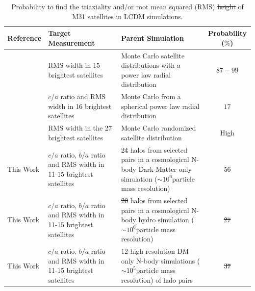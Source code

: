 \documentclass[a4paper,fleqn,usenatbib]{mnras}
\newcommand{\Msun}{{\ifmmode{{\rm{M_{\odot}}}}\else{${\rm{M_{\odot}}}$}\fi}}
\providecommand{\DIFaddtex}[1]{{\protect\color{blue}\uwave{#1}}} %
\providecommand{\DIFdeltex}[1]{{\protect\color{red}\sout{#1}}}                      %
\providecommand{\DIFaddFL}[1]{\DIFadd{#1}} %
\providecommand{\DIFdelFL}[1]{\DIFdel{#1}} %
\providecommand{\DIFaddbeginFL}{} %
\providecommand{\DIFaddendFL}{} %
\providecommand{\DIFdelbeginFL}{} %
\providecommand{\DIFdelendFL}{} %
\providecommand{\DIFadd}[1]{\texorpdfstring{\DIFaddtex{#1}}{#1}} %
\providecommand{\DIFdel}[1]{\texorpdfstring{\DIFdeltex{#1}}{}} %
\newcommand{\DIFscaledelfig}{0.5}
\newlength{\DIFdelgraphicswidth} %
\newlength{\DIFdelgraphicsheight} %
\newcommand{\DIFaddincludegraphics}[2][]{{\color{blue}\fbox{\DIFOincludegraphics[#1]{#2}}}} %
\newcommand{\DIFdelincludegraphics}[2][]{%
\sbox{\DIFdelgraphicsbox}{\DIFOincludegraphics[#1]{#2}}%
\settoboxwidth{\DIFdelgraphicswidth}{\DIFdelgraphicsbox} %
\settoboxtotalheight{\DIFdelgraphicsheight}{\DIFdelgraphicsbox} %
\scalebox{\DIFscaledelfig}{%
\parbox[b]{\DIFdelgraphicswidth}{\usebox{\DIFdelgraphicsbox}\\[-\baselineskip] \rule{\DIFdelgraphicswidth}{0em}}\llap{\resizebox{\DIFdelgraphicswidth}{\DIFdelgraphicsheight}{%
\setlength{\unitlength}{\DIFdelgraphicswidth}%
\begin{picture}(1,1)%
\thicklines\linethickness{2pt} %
{\color[rgb]{1,0,0}\put(0,0){\framebox(1,1){}}}%
{\color[rgb]{1,0,0}\put(0,0){\line( 1,1){1}}}%
{\color[rgb]{1,0,0}\put(0,1){\line(1,-1){1}}}%
\end{picture}%
}\hspace*{3pt}}} %
} %
\DeclareRobustCommand{\DIFaddbeginFL}{\DIFOaddbeginFL \let\includegraphics\DIFaddincludegraphics} %
\DeclareRobustCommand{\DIFaddendFL}{\DIFOaddendFL \let\includegraphics\DIFOincludegraphics} %
\DeclareRobustCommand{\DIFdelbeginFL}{\DIFOdelbeginFL \let\includegraphics\DIFdelincludegraphics} %
\DeclareRobustCommand{\DIFdelendFL}{\DIFOaddendFL \let\includegraphics\DIFOincludegraphics} %
\begin{document}
\begin{table}
\centering
\begin{tabular}{|p{4.0cm}|p{4.5cm}| p{5.5cm}| c|}\hline
Reference & Target Measurement & Parent Simulation & Probability ($\%$)\\\hline
\text{\cite{2006AJ....131.1405K}} & RMS width in 15 brightest
satellites & Monte Carlo satellite distributions with a power law
radial distribution & $87-99$\\
\text{\cite{2007MNRAS.374.1125M}} & $c/a$ ratio and RMS width in 16 brightest satellites & Monte Carlo from a spherical power law radial
distribution & $17$\\
\text{\cite{2013ApJ...766..120C}}& RMS width in the 27 brightest
satellites & Monte Carlo randomized satellite distribution & High\\
This Work & $c/a$ ratio, $b/a$ ratio and RMS width in 11-15 brightest
satellites & \DIFdelbeginFL \DIFdelFL{24 }\DIFdelendFL \DIFaddbeginFL \DIFaddFL{27 }\DIFaddendFL halos from selected pairs in a cosmological N-body Dark Matter only simulation ($\sim
10^{6}$\Msun particle mass resolution)& \DIFdelbeginFL \DIFdelFL{56 }\DIFdelendFL \DIFaddbeginFL \DIFaddFL{$<80$ }\DIFaddendFL \\
This Work & $c/a$ ratio, $b/a$ ratio and RMS width in 11-15 brightest
satellites & \DIFdelbeginFL \DIFdelFL{20 }\DIFdelendFL \DIFaddbeginFL \DIFaddFL{24 }\DIFaddendFL halos from selected pairs in a cosmological N-body hydro simulation ($\sim
10^{6}$\Msun particle mass resolution)& \DIFdelbeginFL \DIFdelFL{27 }\DIFdelendFL \DIFaddbeginFL \DIFaddFL{$<71$ }\DIFaddendFL \\
This Work & $c/a$ ratio, $b/a$ ratio and RMS width in 11-15 brightest
satellites & 12 high resolution DM only N-body simulations ($\sim
10^{5}$\Msun particle mass resolution) of halo pairs & \DIFdelbeginFL \DIFdelFL{37 }\DIFdelendFL \DIFaddbeginFL \DIFaddFL{$<57$ }\DIFaddendFL \\
\hline
\end{tabular}
\caption{Probability to find  the triaxiality and/or root mean squared
  (RMS) \DIFdelbeginFL \DIFdelFL{height }\DIFdelendFL \DIFaddbeginFL \DIFaddFL{width }\DIFaddendFL of M31 satellites in LCDM simulations. 
\label{table:M31}}
\end{table}
\end{document}
